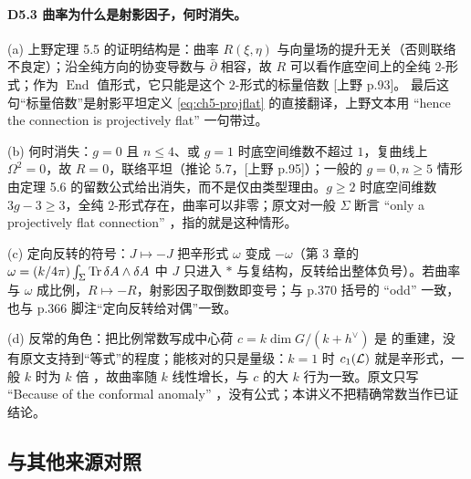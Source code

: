 \paragraph{D5.3 曲率为什么是射影因子，何时消失。} (a) 上野定理 5.5 的证明结构是：曲率 $R(\xi,\eta)$ 与向量场的提升无关（否则联络不良定）；沿全纯方向的协变导数与 $\bar\partial$ 相容，故 $R$ 可以看作底空间上的全纯 $2$-形式；作为 $\operatorname{End}$ 值形式，它只能是这个 $2$-形式的标量倍数 [上野 p.93]。\ours{} 最后这句“标量倍数”是射影平坦定义 \eqref{eq:ch5-projflat} 的直接翻译，上野文本用 “hence the connection is projectively flat” 一句带过。

(b) 何时消失：$g=0$ 且 $n\le4$、或 $g=1$ 时底空间维数不超过 $1$，复曲线上 $\Omega^2=0$，故 $R=0$，联络平坦（推论 5.7，[上野 p.95]）；一般的 $g=0,n\ge5$ 情形由定理 5.6 的留数公式给出消失，而不是仅由类型理由。$g\ge2$ 时底空间维数 $3g-3\ge3$，全纯 $2$-形式存在，曲率可以非零；原文对一般 $\Sigma$ 断言 “only a projectively flat connection” ，指的就是这种情形。

(c) 定向反转的符号：$J\mapsto-J$ 把辛形式 $\omega$ 变成 $-\omega$（第 3 章的 $\omega=(k/4\pi)\int_\Sigma\operatorname{Tr}\delta A\wedge\delta A$ 中 $J$ 只进入 $*$ 与复结构，反转给出整体负号）。若曲率与 $\omega$ 成比例，$R\mapsto-R$，射影因子取倒数即变号；与 p.370 括号的 “odd” 一致，也与 p.366 脚注“定向反转给对偶”一致。

(d) 反常的角色：把比例常数写成中心荷 $c=k\dim G/(k+h^\vee)$ 是 \ours{} 的重建，没有原文支持到“等式”的程度；能核对的只是量级：$k=1$ 时 $c_1(\mathcal{L})$ 就是辛形式，一般 $k$ 时为 $k$ 倍 ，故曲率随 $k$ 线性增长，与 $c$ 的大 $k$ 行为一致。原文只写 “Because of the conformal anomaly” ，没有公式；本讲义不把精确常数当作已证结论。

\subsection{与其他来源对照}
\label{sec:ch5-table}

